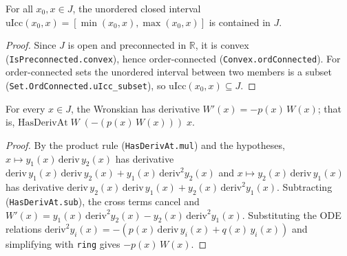 \begin{lemma}
    \label{lem:uIcc-subset-J}
    \leanok
    For all $x_0, x \in J$, the unordered closed interval
    $\mathrm{uIcc}(x_0, x) = [\min(x_0,x), \max(x_0,x)]$ is contained in $J$.
\end{lemma}
\begin{proof}
    Since $J$ is open and preconnected in $\mathbb{R}$, it is convex
    (\texttt{IsPreconnected.convex}), hence order-connected
    (\texttt{Convex.ordConnected}). For order-connected sets the unordered
    interval between two members is a subset
    (\texttt{Set.OrdConnected.uIcc\_subset}), so
    $\mathrm{uIcc}(x_0, x) \subseteq J$.
\end{proof}

\begin{lemma}
    \label{lem:wronskian-deriv}
    \leanok
    For every $x \in J$, the Wronskian has derivative
    $W'(x) = -p(x)\,W(x)$; that is, $\mathrm{HasDerivAt}\;W\;(-(p(x)\,W(x)))\;x$.
\end{lemma}
\begin{proof}
    By the product rule (\texttt{HasDerivAt.mul}) and the hypotheses,
    $x \mapsto y_1(x)\,\mathrm{deriv}\,y_2(x)$ has derivative
    $\mathrm{deriv}\,y_1(x)\,\mathrm{deriv}\,y_2(x) + y_1(x)\,\mathrm{deriv}^2 y_2(x)$
    and $x \mapsto y_2(x)\,\mathrm{deriv}\,y_1(x)$ has derivative
    $\mathrm{deriv}\,y_2(x)\,\mathrm{deriv}\,y_1(x) + y_2(x)\,\mathrm{deriv}^2 y_1(x)$.
    Subtracting (\texttt{HasDerivAt.sub}), the cross terms cancel and
    $W'(x) = y_1(x)\,\mathrm{deriv}^2 y_2(x) - y_2(x)\,\mathrm{deriv}^2 y_1(x)$.
    Substituting the ODE relations
    $\mathrm{deriv}^2 y_i(x) = -(p(x)\,\mathrm{deriv}\,y_i(x) + q(x)\,y_i(x))$ and
    simplifying with \texttt{ring} gives $-p(x)\,W(x)$.
\end{proof}

